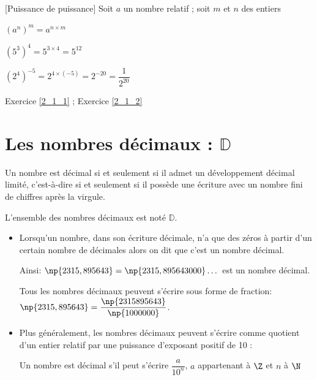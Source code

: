 \noindent \begin{minipage}{11cm}
\begin{prop}{}{}[Puissance de puissance]
Soit $a$ un nombre relatif ; soit $m$ et $n$ des entiers
\begin{center}
$\left( a^n \right)^{m} = a^{n \times m}$
\end{center}
\end{prop}
\end{minipage}
\hspace{5mm}
\begin{minipage}{5cm}
\begin{ex}{}{}
$\left( 5^3 \right)^{4} = 5^{3 \times 4} = 5^{12}$

$\left( 2^4 \right)^{-5} = 2^{4 \times (-5)} = 2^{-20} = \dfrac{1}{2^{20}}$
\end{ex}
\end{minipage}

\begin{exec}
\hspace{0.5cm} \hypertarget{Ex_2_1_1}{} Exercice \ref{2_1_1} \hspace{0.5cm};
\hspace{0.5cm}  \hypertarget{Ex_2_1_2}{} Exercice \ref{2_1_2}
\end{exec}

\section{Les nombres décimaux : $\mathbb{D}$}

\vspace{-2mm}
\begin{defi}{}{}
Un nombre est décimal si et seulement si il admet un développement décimal limité, c'est-à-dire si et seulement si il possède une écriture avec un nombre fini de chiffres après la virgule.

\noindent L'ensemble des nombres décimaux est noté $\mathbb{D}$. 
\end{defi}

\begin{rem}{}{}
\begin{itemize}
\item  Lorsqu'un nombre, dans son écriture décimale, n'a que des zéros à partir d'un certain nombre de décimales alors on dit que c'est un nombre décimal. 

Ainsi: $\np{2315,895643}= \np{2315,895643000}\dots$ est un nombre décimal.
	
Tous les nombres décimaux peuvent s'écrire sous forme de fraction: $\np{2315,895643}=\dfrac{\np{2315895643}}{\np{1000000}}$.
\item  Plus généralement, les nombres décimaux peuvent s'écrire comme quotient d'un entier relatif par une puissance d'exposant positif de 10 :

Un nombre est décimal s'il peut s'écrire $\dfrac{a}{10^n}$, $a$ appartenant à $\Z$ et $n$ à $\N$
\end{itemize}
\end{rem}


